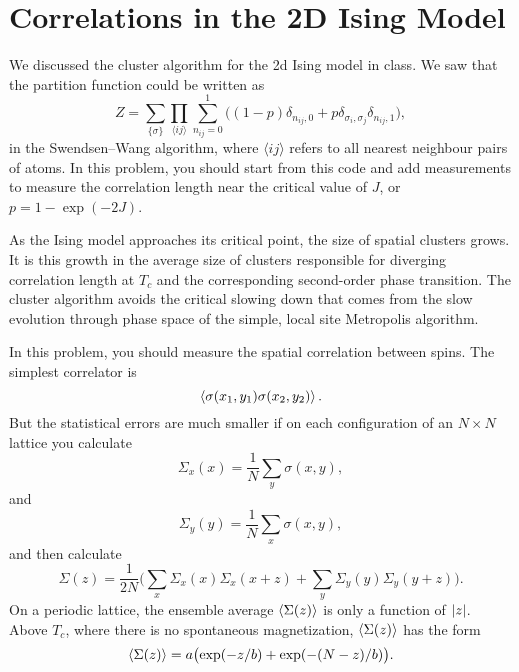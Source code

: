 \section{Correlations in the 2D Ising Model}

We discussed the cluster algorithm for the 2d Ising model in class. We saw that the
partition function could be written as
%
\begin{equation}
    Z = \sum_{\{\sigma\}} \prod_{\langle i j \rangle} \sum_{n_{ij}=0}^1
    \bigl((1 - p) \delta_{n_{ij},0} + p \delta_{\sigma_i,\sigma_j} \delta_{n_{ij},1}\bigr),
\end{equation}
%
in the Swendsen--Wang algorithm,
where \(\langle i j \rangle\) refers to all nearest neighbour pairs of atoms.
In this problem, you should start from this code and add measurements to measure the
correlation length near the critical value of \(J\), or \(p=1 - \exp(-2J)\).

As the Ising model approaches its critical point, the size of spatial clusters grows. It is
this growth in the average size of clusters responsible for diverging correlation
length at \(T_c\) and the corresponding second-order phase transition. The cluster algorithm
avoids the critical slowing down that comes from the slow evolution through phase space of
the simple, local site Metropolis algorithm.

In this problem, you should measure the spatial correlation between spins. The simplest
correlator is
%
\begin{equation}
    \expval{ \sigma(x_1, y_1) \sigma(x_2, y_2) }.
\end{equation}
%
But the statistical errors are much smaller if on each configuration of an \(N \times N\)
lattice you calculate
%
\begin{equation}
    \Sigma_x(x) = \frac{ 1 }{ N } \sum_y \sigma(x, y),
\end{equation}
%
and
%
\begin{equation}
    \Sigma_y(y) = \frac{ 1 }{ N } \sum_x \sigma(x, y),
\end{equation}
%
and then calculate
%
\begin{equation}\label{eq:Sigmaz}
    \Sigma(z) = \frac{ 1 }{ 2N } \biggl( \sum_x \Sigma_x(x) \Sigma_x(x+z)
    + \sum_y \Sigma_y(y) \Sigma_y(y+z) \biggr).
\end{equation}
%
On a periodic lattice, the ensemble average \(\expval{\Sigma(z)}\) is only a
function of \(\abs{z}\). Above \(T_c\),
where there is no spontaneous magnetization, \(\expval{\Sigma(z)}\) has the form
%
\begin{equation}\label{eq:Sigmazbar}
    \expval{\Sigma(z)} = a \bigl(\exp(-z / b) + \exp(-(N - z) / b)\bigr).
\end{equation}

